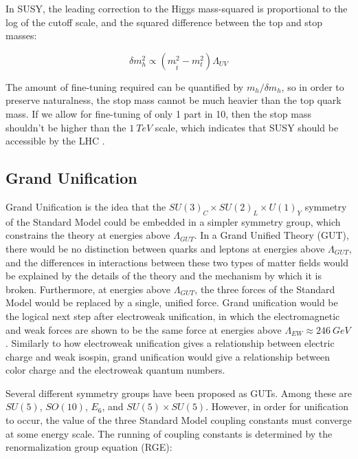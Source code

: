 In SUSY, the leading correction to the Higgs mass-squared is proportional to the log of the cutoff scale,
and the squared difference between the top and stop masses:

\begin{equation}\label{eq:susy_higgs_correction}
    \delta m_h^2 \propto \left(m_{\tilde{t}}^2 - m_t^2\right)  \Lambda_{UV}
\end{equation}\cite{susy-pheno-2000}

The amount of fine-tuning required can be quantified by $m_h / \delta m_h $, so in order to preserve naturalness,
the stop mass cannot be much heavier than the top quark mass.
If we allow for fine-tuning of only 1 part in 10, then the stop mass shouldn't be higher than the $1~TeV$ scale,
which indicates that SUSY should be accessible by the LHC .

\subsection{Grand Unification}\label{subsec:susy_unification}

Grand Unification is the idea that the $SU(3)_C \times SU(2)_L \times U(1)_Y$ symmetry of the Standard Model
could be embedded in a simpler symmetry group, which constrains the theory at energies above $\Lambda_{GUT}$.
In a Grand Unified Theory (GUT), there would be no distinction between quarks and leptons at energies above $\Lambda_{GUT}$,
and the differences in interactions between these two types of matter fields would be explained by the details of the
theory and the mechanism by which it is broken.
Furthermore, at energies above $\Lambda_{GUT}$, the three forces of the Standard Model would be replaced by a single, unified force.
Grand unification would be the logical next step after electroweak unification,
in which the electromagnetic and weak forces are shown to be the same force at energies above $\Lambda_{EW}\approx 246~GeV$.
Similarly to how electroweak unification gives a relationship between electric charge and weak isospin,
grand unification would give a relationship between color charge and the electroweak quantum numbers.

Several different symmetry groups have been proposed as GUTs.
Among these are $SU(5)$, $SO(10)$, $E_6$, and $SU(5)\times SU(5)$.\cite{susy-unification-1998}
However, in order for unification to occur, the value of the three Standard Model coupling constants must converge at some energy scale.
The running of coupling constants is determined by the renormalization group equation (RGE):

